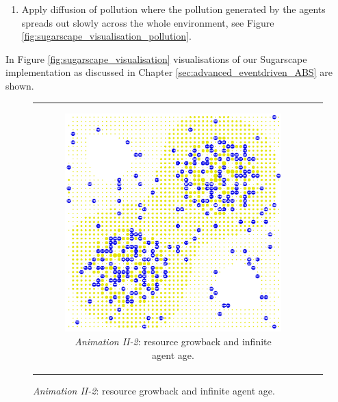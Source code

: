\begin{enumerate}
\begin{enumerate}
			\item Apply diffusion of pollution where the pollution generated by the agents spreads out slowly across the whole environment, see Figure \ref{fig:sugarscape_visualisation_pollution}.
		\end{enumerate}
\end{enumerate}

In Figure \ref{fig:sugarscape_visualisation} visualisations of our Sugarscape implementation as discussed in Chapter \ref{sec:advanced_eventdriven_ABS} are shown.

\begin{figure}[H]
\begin{center}
	\begin{tabular}{c c}
		\begin{subfigure}[b]{0.4\textwidth}
			\centering
			\includegraphics[width=1\textwidth, angle=0]{./fig/background/abs/sugarscape_normal.png}
			\caption{\textit{Animation II-2}: resource growback and infinite agent age.}
			\label{fig:sugarscape_visualisation_normal}
		\end{subfigure}
		
		&
    	

\end{tabular}
\end{center}
\end{figure}
